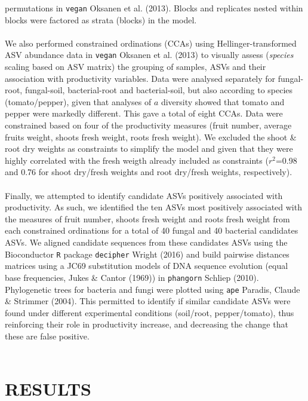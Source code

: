 \documentclass[11pt,]{article}
\begin{document}
permutations in \texttt{vegan} Oksanen et al. (2013). Blocks and
replicates nested within blocks were factored as strata (blocks) in the
model.\\
\hspace*{0.333em}\\
We also performed constrained ordinations (CCAs) using
Hellinger-transformed ASV abundance data in \texttt{vegan} Oksanen et
al. (2013) to visually assess (\emph{species} scaling based on ASV
matrix) the grouping of samples, ASVs and their association with
productivity variables. Data were analysed separately for fungal-root,
fungal-soil, bacterial-root and bacterial-soil, but also according to
species (tomato/pepper), given that analyses of \(a\) diversity showed
that tomato and pepper were markedly different. This gave a total of
eight CCAs. Data were constrained based on four of the productivity
measures (fruit number, average fruits weight, shoots fresh weight,
roots fresh weight). We excluded the shoot \& root dry weights as
constraints to simplify the model and given that they were highly
correlated with the fresh weigth already included as constraints
(\(r^2\)=0.98 and 0.76 for shoot dry/fresh weights and root dry/fresh
weights, respectively). ~\\
\hspace*{0.333em}\\
Finally, we attempted to identify candidate ASVs positively associated
with productivity. As such, we identified the ten ASVs most positively
associated with the measures of fruit number, shoots fresh weight and
roots fresh weight from each constrained ordinations for a total of 40
fungal and 40 bacterial candidates ASVs. We aligned candidate sequences
from these candidates ASVs using the Bioconductor \texttt{R} package
\texttt{decipher} Wright (2016) and build pairwise distances matrices
using a JC69 substitution models of DNA sequence evolution (equal base
frequencies, Jukes \& Cantor (1969)) in \texttt{phangorn} Schliep
(2010). Phylogenetic trees for bacteria and fungi were plotted using
\texttt{ape} Paradis, Claude \& Strimmer (2004). This permitted to
identify if similar candidate ASVs were found under different
experimental conditions (soil/root, pepper/tomato), thus reinforcing
their role in productivity increase, and decreasing the change that
these are false positive.\\
\hspace*{0.333em} ~

\newpage  

\section{RESULTS}\label{results}
\end{document}
